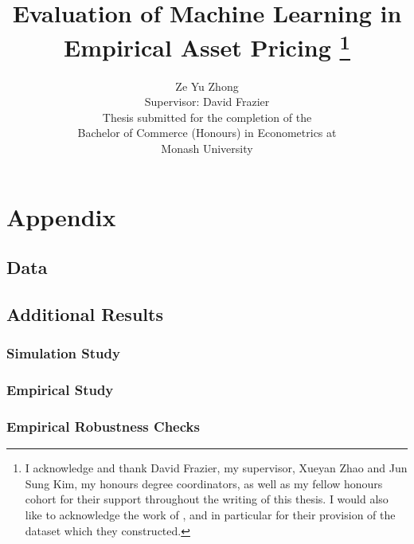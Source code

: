 \documentclass[11pt, a4paper, table]{article}
\title{Evaluation of Machine Learning in Empirical Asset Pricing
\thanks{I acknowledge and thank David Frazier, my supervisor, Xueyan Zhao and Jun Sung Kim, my honours degree coordinators, as well as my fellow honours cohort for their support throughout the writing of this thesis. I would also like to acknowledge the work of \cite{gu_empirical_2018}, and in particular for their provision of the dataset which they constructed.}
}
\author{Ze Yu Zhong \\
Supervisor: David Frazier \\ 
Thesis submitted for the completion of the \\
Bachelor of Commerce (Honours) in Econometrics at \\
Monash University}
\begin{document}
\section{Appendix}

\subsection{Data}

\subsection{Additional Results}

\subsubsection{Simulation Study}





\newpage



\subsubsection{Empirical Study}


\subsubsection{Empirical Robustness Checks}
















\end{document}
